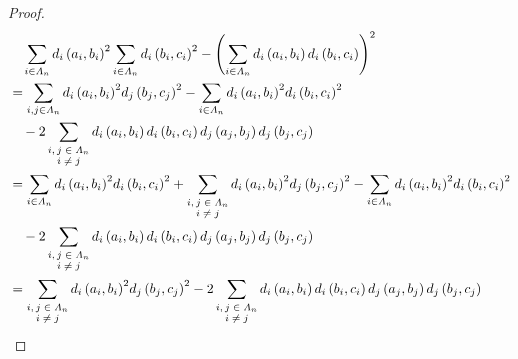 \documentclass[dvipdfmx]{jsarticle}
\begin{document}
\begin{proof}
\begin{align*}
&\quad \sum_{i \in \varLambda_{n}} {d_{i}\left( a_{i},b_{i} \right)}^{2}\sum_{i \in \varLambda_{n}} {d_{i}\left( b_{i},c_{i} \right)}^{2} - \left( \sum_{i \in \varLambda_{n}} {d_{i}\left( a_{i},b_{i} \right)d_{i}\left( b_{i},c_{i} \right)} \right)^{2}\\
&= \sum_{i,j \in \varLambda_{n}} {{d_{i}\left( a_{i},b_{i} \right)}^{2}{d_{j}\left( b_{j},c_{j} \right)}^{2}} - \sum_{i \in \varLambda_{n}} {{d_{i}\left( a_{i},b_{i} \right)}^{2}{d_{i}\left( b_{i},c_{i} \right)}^{2}} \\
&\quad - 2\sum_{\scriptsize \begin{matrix}
i,j \in \varLambda_{n} \\
i \neq j \\
\end{matrix}} {d_{i}\left( a_{i},b_{i} \right)d_{i}\left( b_{i},c_{i} \right)d_{j}\left( a_{j},b_{j} \right)d_{j}\left( b_{j},c_{j} \right)}\\
&= \sum_{i \in \varLambda_{n}} {{d_{i}\left( a_{i},b_{i} \right)}^{2}{d_{i}\left( b_{i},c_{i} \right)}^{2}} + \sum_{\scriptsize \begin{matrix}
i,j \in \varLambda_{n} \\
i \neq j \\
\end{matrix}} {{d_{i}\left( a_{i},b_{i} \right)}^{2}{d_{j}\left( b_{j},c_{j} \right)}^{2}} - \sum_{i \in \varLambda_{n}} {{d_{i}\left( a_{i},b_{i} \right)}^{2}{d_{i}\left( b_{i},c_{i} \right)}^{2}} \\
&\quad - 2\sum_{\scriptsize \begin{matrix}
i,j \in \varLambda_{n} \\
i \neq j \\
\end{matrix}} {d_{i}\left( a_{i},b_{i} \right)d_{i}\left( b_{i},c_{i} \right)d_{j}\left( a_{j},b_{j} \right)d_{j}\left( b_{j},c_{j} \right)}\\
&= \sum_{\scriptsize \begin{matrix}
i,j \in \varLambda_{n} \\
i \neq j \\
\end{matrix}} {{d_{i}\left( a_{i},b_{i} \right)}^{2}{d_{j}\left( b_{j},c_{j} \right)}^{2}} - 2\sum_{\scriptsize \begin{matrix}
i,j \in \varLambda_{n} \\
i \neq j \\
\end{matrix}} {d_{i}\left( a_{i},b_{i} \right)d_{i}\left( b_{i},c_{i} \right)d_{j}\left( a_{j},b_{j} \right)d_{j}\left( b_{j},c_{j} \right)}\\

\end{align*}
\end{proof}
\end{document}

